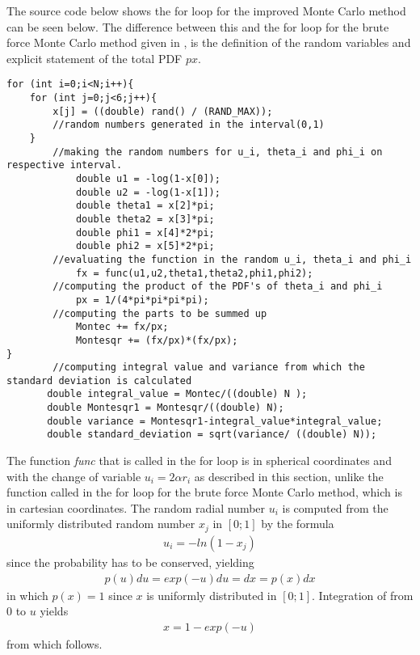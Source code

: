The source code below shows the for loop for the improved Monte Carlo method can be seen below. 
The difference between this and the for loop for the brute force Monte Carlo method given in , is the definition of the random variables and explicit statement of the total PDF $px$.
\begin{lstlisting}
for (int i=0;i<N;i++){
	for (int j=0;j<6;j++){
		x[j] = ((double) rand() / (RAND_MAX)); 
		//random numbers generated in the interval(0,1)
    }
		//making the random numbers for u_i, theta_i and phi_i on respective interval.            
            double u1 = -log(1-x[0]);
            double u2 = -log(1-x[1]);
            double theta1 = x[2]*pi;
            double theta2 = x[3]*pi;
            double phi1 = x[4]*2*pi;
            double phi2 = x[5]*2*pi;
		//evaluating the function in the random u_i, theta_i and phi_i
            fx = func(u1,u2,theta1,theta2,phi1,phi2);
		//computing the product of the PDF's of theta_i and phi_i
            px = 1/(4*pi*pi*pi*pi);
		//computing the parts to be summed up
            Montec += fx/px;
            Montesqr += (fx/px)*(fx/px);
}
		//computing integral value and variance from which the standard deviation is calculated
       double integral_value = Montec/((double) N );
       double Montesqr1 = Montesqr/((double) N);
       double variance = Montesqr1-integral_value*integral_value;
       double standard_deviation = sqrt(variance/ ((double) N));
\end{lstlisting}
The function \textit{func} that is called in the for loop is in spherical coordinates and with the change of variable $u_i = 2\alpha r_i$ as described in this section, unlike the function called in the for loop for the brute force Monte Carlo method, which is in cartesian coordinates. 
The random radial number $u_i$ is computed from the uniformly distributed random number $x_j$ in $[0;1]$ by the formula
\begin{align}
	u_i = -ln(1-x_j)
	\label{eq:ImprovedMCMethod6}
\end{align}
since the probability has to be conserved, yielding
\begin{align}
	p(u) du = exp(-u) du = dx = p(x)dx
	\label{eq:ImprovedMCMethod5}
\end{align}
in which $p(x) = 1$ since $x$ is uniformly distributed in $[0;1]$.
Integration of  from $0$ to $u$ yields
\begin{align}
	x = 1-exp(-u)
\end{align}
from which  follows.